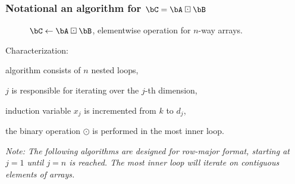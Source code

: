 \begin{frame}
\frametitle{Notational an algorithm for $\bC = \bA \boxdot \bB$}
\begin{figure}
\begin{minipage}{0.8\textwidth} 
\begin{algorithm}[H]
\DontPrintSemicolon
{}
%
\SetAlgoVlined
{}
\caption{$\bC \leftarrow \bA \boxdot \bB$, elementwise operation for $n$-way arrays.\label{alg:map1}}
\end{algorithm}%
\end{minipage}
\end{figure}
\vfill
Characterization:
\bi
\item algorithm consists of $n$ nested loops,
\item $j$ is responsible for iterating over the $j$-th dimension,
\item induction variable $x_j$ is incremented from $k$ to $d_j$,
\item the binary operation $\odot$ is performed in the most inner loop.
\ei

\vfill

\emph{Note: The following algorithms are designed for row-major format, starting at $j=1$ until $j=n$ is reached. The most inner loop will iterate on contiguous elements of arrays.}
\end{frame}


